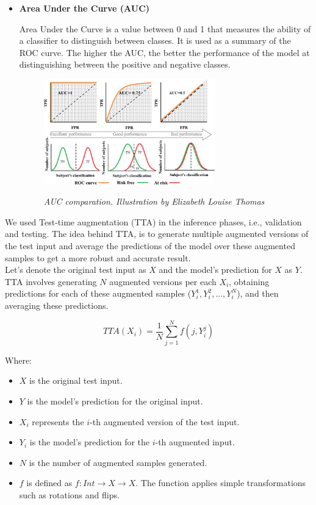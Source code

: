 \begin{itemize}
  \item {\bf Area Under the Curve (AUC)}

  Area Under the Curve is a value between 0 and 1 that measures the
  ability of a classifier to distinguish between classes. It is used as a summary of
  the ROC curve. The higher the AUC, the better the performance of the model at
  distinguishing between the positive and negative classes.

  \begin{figure}[H]
    \centering
    \includegraphics[width=0.7\textwidth]{imatges/validation-strategy/auc.png}
    \caption[AUC-ROC performance]{\textit{AUC comparation. Illustration by Elizabeth Louise Thomas}}
    {\label{fig:auc-roc}}
  \end{figure}

\end{itemize}

We used Test-time augmentation (TTA) in the inference phases, i.e., validation
and testing. The idea behind TTA, is to generate multiple augmented versions of
the test input and average the predictions of the model over these augmented
samples to get a more robust and accurate result. \\

Let's denote the original test input as \(X\) and the model's prediction for
\(X\) as \(Y\). TTA involves generating \(N\) augmented versions per each
\(X_i\), obtaining predictions for each of these augmented samples (\(Y_i^1, Y_i^2,
..., Y_i^N\)), and then averaging these predictions.

\[ TTA(X_i) = \frac{1}{N} \sum_{j=1}^{N} f(j, Y_i^j) \]

Where:

\begin{itemize}
  \item \(X\) is the original test input.
  \item \(Y\) is the model's prediction for the original input.
  \item \(X_i\) represents the \(i\)-th augmented version of the test input.
  \item \(Y_i\) is the model's prediction for the \(i\)-th augmented input.
  \item \(N\) is the number of augmented samples generated.
  \item \(f\) is defined as \(f: Int \rightarrow X \rightarrow X\). The
    function applies simple transformations such as rotations and flips.
\end{itemize}


